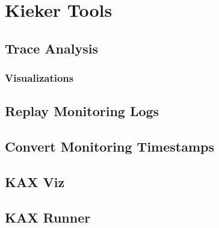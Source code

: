 \chapter{Kieker Tools}\label{chp:Kieker-Tools}
	\section{Trace Analysis}
		\subsection{Visualizations}
	\section{Replay Monitoring Logs}
	\section{Convert Monitoring Timestamps}
	\section{KAX Viz}
	\section{KAX Runner}
